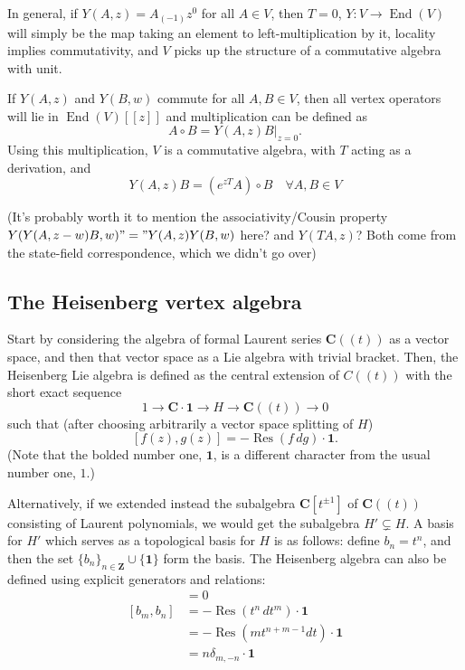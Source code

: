 \documentclass{article}
\newcommand{\CC}{\mathbold{C}}
\newcommand{\ZZ}{\mathbold{Z}}
\newcommand{\one}{\mathbold{1}}
\DeclareMathOperator{\Res}{Res}
\DeclareMathOperator{\End}{End}
\begin{document}
In general, if $Y(A,z)=A_{(-1)}z^0$ for all $A \in V$, then $T=0$, $Y: V \rightarrow \End(V)$ will simply be the map taking an element to left-multiplication by it, locality implies commutativity, and $V$ picks up the structure of a commutative algebra with unit.

If $Y(A,z)$ and $Y(B,w)$ commute for all $A,B \in V$, then all vertex operators will lie in $\End(V)[[z]]$ and multiplication can be defined as
\[A \circ B = Y(A,z)B|_{z=0}. \]
Using this multiplication, $V$ is a commutative algebra, with $T$ acting as a derivation, and
\[Y(A,z)B=(e^{zT}A) \circ B \quad \forall A,B \in V \]

(It's probably worth it to mention the associativity/Cousin property $Y(Y(A,z-w)B,w)"="Y(A,z)Y(B,w)$ here? and $Y(TA,z)$? Both come from the state-field correspondence, which we didn't go over)

\subsection{The Heisenberg vertex algebra}
Start by considering the algebra of formal Laurent series $\CC((t))$ as a vector space, and then that vector space as a Lie algebra with trivial bracket.  Then, the Heisenberg Lie algebra is defined as the central extension of $C((t))$ with the short exact sequence
\[1 \rightarrow \CC \cdot \one \rightarrow H \rightarrow \CC((t)) \rightarrow 0 \]
such that (after choosing arbitrarily a vector space splitting of $H$)
\[[f(z),g(z)]=-\Res(f\,dg) \cdot \one. \]
(Note that the bolded number one, $\one$, is a different character from the usual number one, $1$.)  

Alternatively, if we extended instead the subalgebra $\CC[t^{\pm 1}]$ of $\CC((t))$ consisting of Laurent polynomials, we would get the subalgebra $H' \subsetneq H$.  A basis for $H'$ which serves as a topological basis for $H$ is as follows: define $b_n=t^n$, and then the set $\{b_n\}_{n \in \ZZ} \cup \{\one\}$ form the basis.  The Heisenberg algebra can also be defined using explicit generators and relations:
\begin{align}
  [b_n,\one]&=0\\
  [b_m,b_n]&=-\Res(t^n\,dt^m)\cdot\one\\
  &=-\Res(mt^{n+m-1}dt)\cdot\one\\
  &=n\delta_{m,-n}\cdot\one
\end{align}
\end{document}

